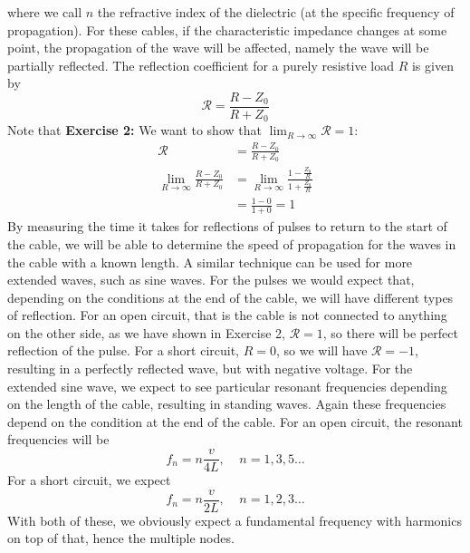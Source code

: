 \documentclass[12pt]{article}
\numberwithin{equation}{section}
\numberwithin{figure}{section}
\begin{document}
    where we call $n$ the refractive index of the dielectric (at the specific frequency of 
    propagation). \newline
    For these cables, if the characteristic impedance changes at some point, the propagation 
    of the wave will be affected, namely the wave will be partially reflected. The reflection 
    coefficient for a purely resistive load $R$ is given by 
    \begin{equation}
        \mathcal{R}=\frac{R-Z_0}{R+Z_0}
        \label{eqn:ReflectionCoefficient}
    \end{equation}
    Note that 
    \textbf{Exercise 2:} We want to show that $\lim_{R\rightarrow\infty} \mathcal{R}=1$:
    \begin{align*}
        \mathcal{R}&=\frac{R-Z_0}{R+Z_0}\\
        \lim_{R\rightarrow\infty} \frac{R-Z_0}{R+Z_0}&=\lim_{R\rightarrow\infty} \frac{1-\frac{Z_0}{R}}{1+\frac{Z_0}{R}}\\
        &=\frac{1-0}{1+0}=1
    \end{align*}
    By measuring the time it takes for reflections of pulses to return to the start of the cable, 
    we will be able to determine the speed of propagation for the waves in the cable with a known 
    length. A similar technique can be used for more extended waves, such as sine waves. \newline
    \newline
    For the pulses we would expect that, depending on the conditions at the end of the cable, 
    we will have different types of reflection. For an open circuit, that is the cable is not 
    connected to anything on the other side, as we have shown in Exercise 2, $\mathcal{R}=1$, so 
    there will be perfect reflection of the pulse. For a short circuit, $R=0$, so we will have 
    $\mathcal{R}=-1$, resulting in a perfectly reflected wave, but with negative voltage.\newline 
    \newline
    For the extended sine wave, we expect to see particular resonant frequencies depending on 
    the length of the cable, resulting in standing waves. Again these frequencies depend on the 
    condition at the end of the cable. For an open circuit, the resonant frequencies will be 
    \begin{equation}
        f_n=n\frac{v}{4L},\;\;\;\; n=1,3,5\dots
        \label{eqn:OpenResonantFrequency}
    \end{equation}
    For a short circuit, we expect 
    \begin{equation}
        f_n=n\frac{v}{2L},\;\;\;\; n=1,2,3\dots 
        \label{eqn:ShortResonantFrequency}
    \end{equation}
    With both of these, we obviously expect a fundamental frequency with harmonics on top of that, 
    hence the multiple nodes. 
    
\end{document}
